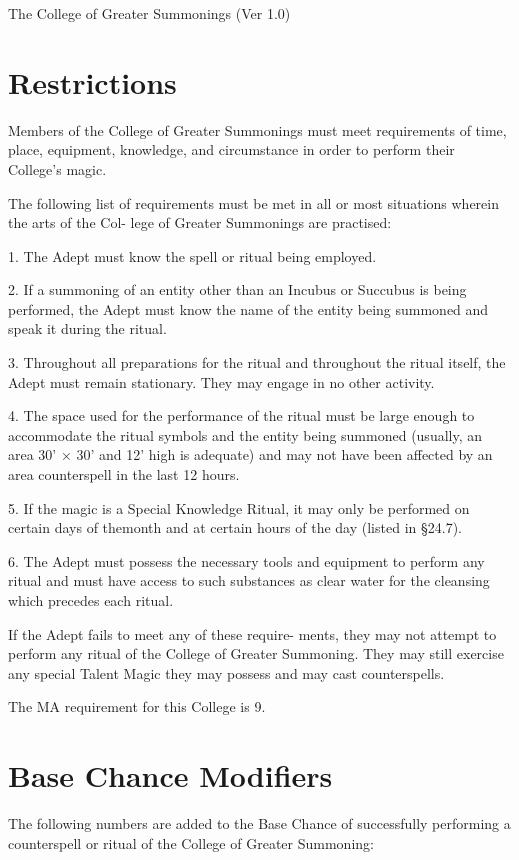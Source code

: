 \begin{Chapter}{The College of Greater Summonings (Ver 1.0)}
\section{Restrictions}

Members of the College of Greater Summonings must meet requirements of
time, place, equipment, knowledge, and circumstance in order to
perform their College’s magic.

The following list of requirements must be met in all or most
situations wherein the arts of the Col- lege of Greater Summonings are
practised:

1.  The Adept must know the spell or ritual being employed.

2. If a summoning of an entity other than an Incubus or Succubus is
being performed, the Adept must know the name of the entity being
summoned and speak it during the ritual.

3.  Throughout all preparations for the ritual and throughout the
ritual itself, the Adept must remain stationary. They may engage in no
other activity.

4. The space used for the performance of the ritual must be large
enough to accommodate the ritual symbols and the entity being summoned
(usually, an area 30’ × 30’ and 12’ high is adequate) and may not have
been affected by an area counterspell in the last 12 hours.

5.  If the magic is a Special Knowledge Ritual, it may only be
performed on certain days of themonth and at certain hours of the day
(listed in §24.7).


6. The Adept must possess the necessary tools and 
equipment  to  perform  any  ritual  and  must  have 
access  to  such  substances  as  clear  water  for  the 
cleansing which precedes each ritual. 

If  the  Adept  fails  to  meet  any  of  these  require-
ments, they  may  not  attempt to  perform any  ritual 
of  the  College  of  Greater  Summoning.  They  may 
still  exercise  any  special  Talent  Magic  they  may 
possess and may cast counterspells. 

The MA requirement for this College is 9. 

\section{Base Chance Modifiers}

The following numbers are added to the Base Chance of successfully
performing a counterspell or ritual of the College of Greater
Summoning:


\end{Chapter}
